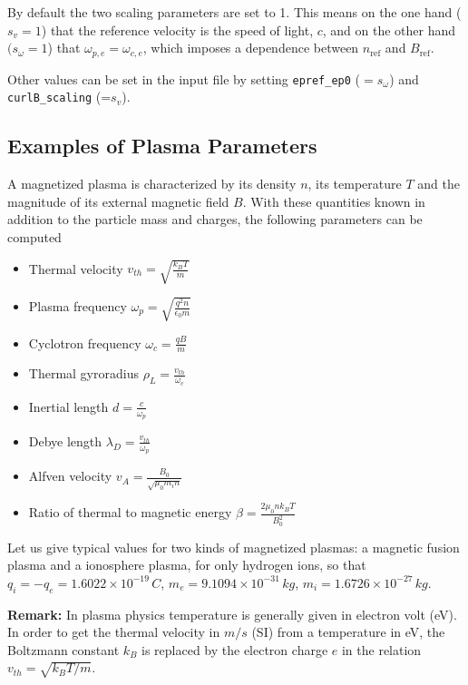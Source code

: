 \documentclass[english]{article}
\newcommand{\nr}{n_{\mathrm{ref}}}
\newcommand{\Br}{B_{\mathrm{ref}}}
\begin{document}
By default the two scaling parameters are set to 1. This means on the one hand ($s_v=1$) that the reference velocity is the speed of light, $c$, and on the other hand $(s_\omega=1$) that $\omega_{p,e}=\omega_{c,e}$, which imposes a dependence between $\nr$ and $\Br$.

Other values can be set in the input file by setting
\verb|epref_ep0| ($=s_\omega$) and \verb|curlB_scaling| (=$s_v$).

\subsection{Examples of Plasma Parameters}

A magnetized plasma is characterized by its density $n$, its temperature $T$ and the magnitude of its external magnetic field $B$. With these quantities known in addition to the particle mass and charges, the following parameters can be computed  

\begin{itemize}
 \item Thermal velocity $v_{th}= \sqrt{\frac{k_B T}{m}}$ 
 \item Plasma frequency $\omega_p = \sqrt{\frac{q^2 n}{\epsilon_0 m}}$
 \item Cyclotron frequency  $\omega_c = \frac{q B}{m}$
 \item Thermal gyroradius $\rho_L = \frac{v_{th}}{\omega_c}$
 \item Inertial length $d=\frac{c}{\omega_p}$
 \item Debye length $\lambda_D = \frac{v_{th}}{\omega_p}$ 
 \item Alfven velocity $v_A = \frac{B_0}{\sqrt{\mu_0 m_i n}}$
 \item Ratio of thermal to magnetic energy $\beta = \frac{2\mu_0 n k_B T}{B_0^2}$
\end{itemize}

Let us give typical values for two kinds of magnetized plasmas: a magnetic fusion plasma and a ionosphere plasma, for only hydrogen ions, so that $q_i = -q_e = 1.6022\times 10^{-19} \,C$, $m_e =  9.1094 \times 10^{-31} \,kg$, $m_i=1.6726 \times 10^{-27}\,kg$.

\textbf{Remark:}
	 In plasma physics temperature is generally given in electron volt (eV). In order to get the thermal velocity in $m/s$ (SI) from a temperature in eV, the Boltzmann constant $k_B$ is replaced by the electron charge $e$ in the relation
	$v_{th}= \sqrt{k_B T / m}$.
\end{document}
